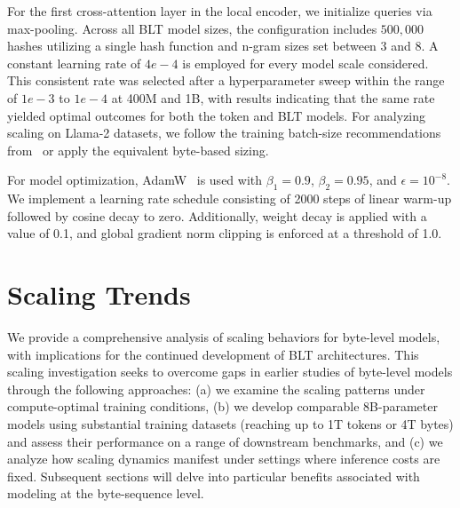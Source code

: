 For the first cross-attention layer in the local encoder, we initialize queries via max-pooling. Across all {\textsc BLT} model sizes, the configuration includes $500,000$ hashes utilizing a single hash function and n-gram sizes set between 3 and 8. A constant learning rate of $4e-4$ is employed for every model scale considered. This consistent rate was selected after a hyperparameter sweep within the range of $1e-3$ to $1e-4$ at 400M and 1B, with results indicating that the same rate yielded optimal outcomes for both the token and {\textsc BLT} models. For analyzing scaling on Llama-2 datasets, we follow the training batch-size recommendations from~\cite{dubey2024llama} or apply the equivalent byte-based sizing.

For model optimization, AdamW~\citep{adamw} is used with $\beta_1 = 0.9$, $\beta_2 = 0.95$, and $\epsilon=10^{-8}$. We implement a learning rate schedule consisting of 2000 steps of linear warm-up followed by cosine decay to zero. Additionally, weight decay is applied with a value of 0.1, and global gradient norm clipping is enforced at a threshold of 1.0.

\section{Scaling Trends}
\label{section:scaling}

We provide a comprehensive analysis of scaling behaviors for byte-level models, with implications for the continued development of {\textsc BLT} architectures. This scaling investigation seeks to overcome gaps in earlier studies of byte-level models through the following approaches: (a) we examine the scaling patterns under compute-optimal training conditions, (b) we develop comparable 8B-parameter models using substantial training datasets (reaching up to 1T tokens or 4T bytes) and assess their performance on a range of downstream benchmarks, and (c) we analyze how scaling dynamics manifest under settings where inference costs are fixed. Subsequent sections will delve into particular benefits associated with modeling at the byte-sequence level.

